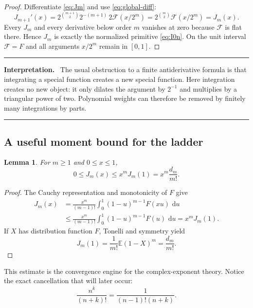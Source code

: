 \documentclass[11pt,oneside]{article}
\numberwithin{equation}{section}
\newtheorem{lemma}[theorem]{Lemma}
\theoremstyle{definition}
\theoremstyle{remark}
\newcommand{\E}{\mathbb E}
\newcommand{\dd}{\,\mathrm d}
\newcommand{\rise}[2]{#1^{\overline{#2}}}
\newenvironment{resultbox}[1]{%
  \par\medskip\noindent\begin{center}\begin{minipage}{0.94\textwidth}%
  \color{deepgreen}\hrule\vspace{0.62em}%
  \color{black}\textbf{\color{deepgreen}#1.}\ }{%
  \par\vspace{0.62em}\color{deepgreen}\hrule
  \end{minipage}\end{center}\medskip}
\begin{document}
\begin{proof}
Differentiate \eqref{eq:Jm} and use \eqref{eq:global-diff}:
\[
 J_{m+1}'(x)
 =2^{\binom{m+1}{2}}2^{-(m+1)}\,2\mathcal F(x/2^m)
 =2^{\binom m2}\mathcal F(x/2^m)=J_m(x).
\]
Every $J_m$ and every derivative below order $m$ vanishes at zero because $\mathcal F$ is
flat there.  Hence $J_m$ is exactly the normalized primitive \eqref{eq:I0n}.  On the unit
interval $\mathcal F=F$ and all arguments $x/2^m$ remain in $[0,1]$.
\end{proof}

\begin{resultbox}{Interpretation}
The usual obstruction to a finite antiderivative formula is that integrating a special
function creates a new special function.  Here integration creates no new object: it only
dilates the argument by $2^{-1}$ and multiplies by a triangular power of two.  Polynomial
weights can therefore be removed by finitely many integrations by parts.
\end{resultbox}

\subsection{A useful moment bound for the ladder}

\begin{lemma}
\label{lem:J-bound}
For $m\ge1$ and $0\le x\le1$,
\begin{equation}
 0\le J_m(x)\le x^mJ_m(1)=x^m\frac{d_m}{m!}.                 \label{eq:J-bound}
\end{equation}
\end{lemma}

\begin{proof}
The Cauchy representation and monotonicity of $F$ give
\begin{align*}
 J_m(x)
 &=\frac{x^m}{(m-1)!}\int_0^1(1-u)^{m-1}F(xu)\,\dd u\\
 &\le\frac{x^m}{(m-1)!}\int_0^1(1-u)^{m-1}F(u)\,\dd u=x^mJ_m(1).
\end{align*}
If $X$ has distribution function $F$, Tonelli and symmetry yield
\[
 J_m(1)=\frac1{m!}\E(1-X)^m=\frac{d_m}{m!}.
\]
\end{proof}

This estimate is the convergence engine for the complex-exponent theory.  Notice the exact
cancellation that will later occur:
\begin{equation}
 \frac{\rise nk}{(n+k)!}=\frac1{(n-1)!(n+k)}.                 \label{eq:rising-cancel}
\end{equation}
\end{document}

